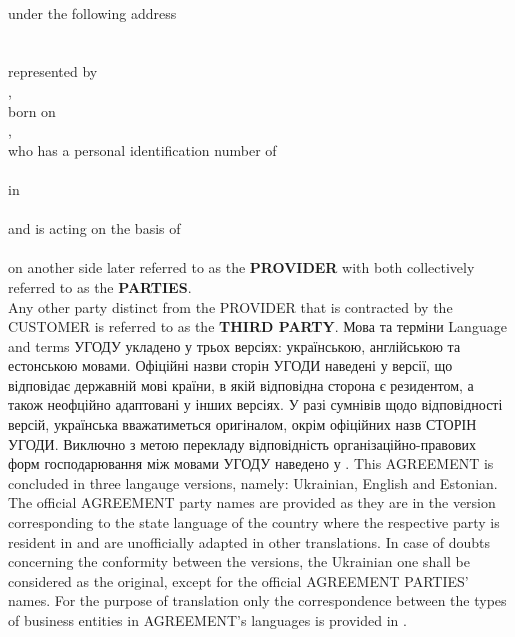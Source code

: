 \begin{Form}
\begin{paracol}{3}
{          \\
          under the following address\\
          \\
          \\
          represented by\\
          ,\\
          born on\\
          ,\\
          who has a personal identification number of\\
          \\
          in \\
          \\
          and is acting on the basis of\\
          \\
          on another side later referred to as the \textbf{PROVIDER} with both collectively referred to as the \textbf{PARTIES}.\\
          Any other party distinct from the PROVIDER that is contracted by the CUSTOMER is referred to as the \textbf{THIRD PARTY}.}
        {}
      \clause
        {Мова та терміни}
        {Language and terms}
        {}
        {УГОДУ укладено у трьох версіях: українською, англійською та естонською мовами. Офіційні назви сторін УГОДИ наведені у версії, що відповідає державній мові країни, в якій відповідна сторона є резидентом, а також неофційно адаптовані у інших версіях. У разі сумнівів щодо відповідності версій, українська вважатиметься оригіналом, окрім офіційних назв СТОРІН УГОДИ. Виключно з метою перекладу відповідність ор\-га\-ні\-за\-цій\-но-правових форм господарювання між мовами УГОДУ наведено у .}
        {This AGREEMENT is concluded in three langauge versions, namely: Ukrainian, English and Estonian. The official AGREEMENT party names are provided as they are in the version corresponding to the state language of the country where the respective party is resident in and are unofficially adapted in other translations. In case of doubts concerning the conformity between the versions, the Ukrainian one shall be considered as the original, except for the official AGREEMENT PARTIES' names. For the purpose of translation only the correspondence between the types of business entities in AGREEMENT's languages is provided in .}

\end{paracol}
\end{Form}
